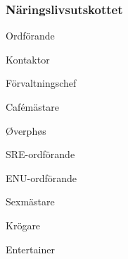 \documentclass[../_main/handlingar.tex]{subfiles}
\begin{document}
\subsubsection*{Näringslivsutskottet}

\newpage
\begin{signatures}{10}
    \mvh
    \signature{Erik Månsson}{Ordförande}
    \signature{Johan Karlberg}{Kontaktor}
    \signature{Sophia Grimmeiss Grahm}{Förvaltningschef}
    \signature{Daniel Bakic}{Cafémästare}
    \signature{Niklas Gustafson}{Øverphøs}
    \signature{Edvard Carlsson}{SRE-ordförande}
    \signature{Josefine Sandström}{ENU-ordförande}
    \signature{Linnea Sjödahl}{Sexmästare}
    \signature{Markus Rahne}{Krögare}
    \signature{Albin Nyström Eklund}{Entertainer}
\end{signatures}
\end{document}
